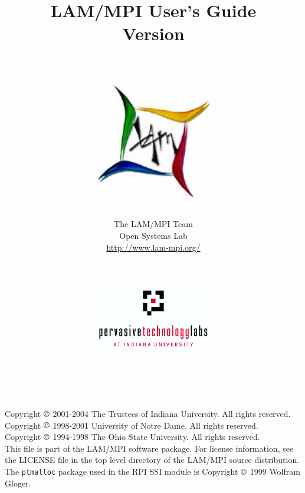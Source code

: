 %
% 
%
%

\title{LAM/MPI User's Guide \\
Version \lamversion \\
\ \\
\centerline{\includegraphics[width=2in]{lam-logo}}}

\author{The LAM/MPI Team \\
Open Systems Lab \\
\url{http://www.lam-mpi.org/} \\
\ \\
\ \\
\centerline{\includegraphics[width=2in]{ptl-logo}}
\ \\
\ \\}

\maketitle

\thispagestyle{empty}

\newpage

\vspace*{6in}

\noindent Copyright $\copyright$ 2001-2004 The Trustees of Indiana
University.  All rights reserved. \\
Copyright $\copyright$ 1998-2001 University of Notre Dame. 
All rights reserved. \\
Copyright $\copyright$ 1994-1998 The Ohio State University.  
All rights reserved. \\

\noindent This file is part of the LAM/MPI software package.  For
license information, see the LICENSE file in the top level directory
of the LAM/MPI source distribution. \\

\noindent The {\tt ptmalloc} package used in the  RPI SSI
module is Copyright $\copyright$ 1999 Wolfram Gloger.

